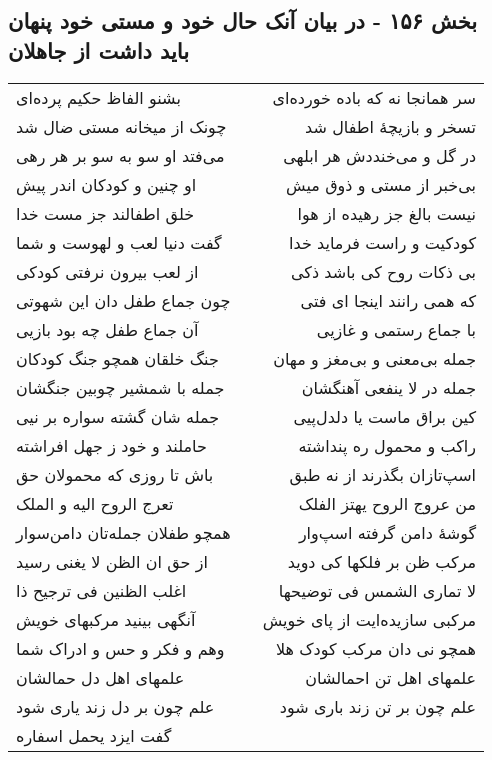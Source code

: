 \begin{center}
\section*{بخش ۱۵۶ - در بیان آنک حال خود و مستی خود پنهان باید داشت از جاهلان}
\label{sec:sh156}
\begin{longtable}{l p{0.5cm} r}
بشنو الفاظ حکیم پرده‌ای
&&
سر همانجا نه که باده خورده‌ای
\\
چونک از میخانه مستی ضال شد
&&
تسخر و بازیچهٔ اطفال شد
\\
می‌فتد او سو به سو بر هر رهی
&&
در گل و می‌خنددش هر ابلهی
\\
او چنین و کودکان اندر پیش
&&
بی‌خبر از مستی و ذوق میش
\\
خلق اطفالند جز مست خدا
&&
نیست بالغ جز رهیده از هوا
\\
گفت دنیا لعب و لهوست و شما
&&
کودکیت و راست فرماید خدا
\\
از لعب بیرون نرفتی کودکی
&&
بی ذکات روح کی باشد ذکی
\\
چون جماع طفل دان این شهوتی
&&
که همی رانند اینجا ای فتی
\\
آن جماع طفل چه بود بازیی
&&
با جماع رستمی و غازیی
\\
جنگ خلقان همچو جنگ کودکان
&&
جمله بی‌معنی و بی‌مغز و مهان
\\
جمله با شمشیر چوبین جنگشان
&&
جمله در لا ینفعی آهنگشان
\\
جمله شان گشته سواره بر نیی
&&
کین براق ماست یا دلدل‌پیی
\\
حاملند و خود ز جهل افراشته
&&
راکب و محمول ره پنداشته
\\
باش تا روزی که محمولان حق
&&
اسپ‌تازان بگذرند از نه طبق
\\
تعرج الروح الیه و الملک
&&
من عروج الروح یهتز الفلک
\\
همچو طفلان جمله‌تان دامن‌سوار
&&
گوشهٔ دامن گرفته اسپ‌وار
\\
از حق ان الظن لا یغنی رسید
&&
مرکب ظن بر فلکها کی دوید
\\
اغلب الظنین فی ترجیح ذا
&&
لا تماری الشمس فی توضیحها
\\
آنگهی بینید مرکبهای خویش
&&
مرکبی سازیده‌ایت از پای خویش
\\
وهم و فکر و حس و ادراک شما
&&
همچو نی دان مرکب کودک هلا
\\
علمهای اهل دل حمالشان
&&
علمهای اهل تن احمالشان
\\
علم چون بر دل زند یاری شود
&&
علم چون بر تن زند باری شود
\\
گفت ایزد یحمل اسفاره

\end{longtable}
\end{center}
